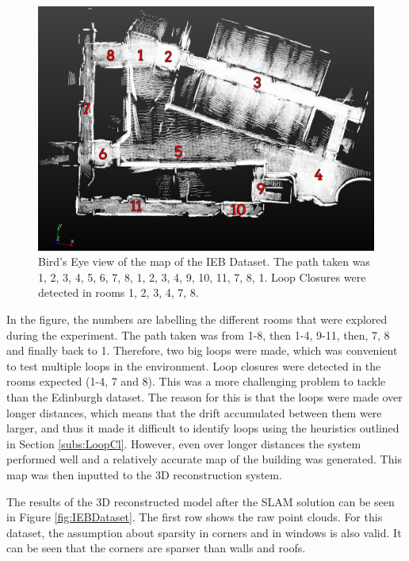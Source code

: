 \documentclass[11pt]{article}
\begin{document}
\begin{figure}[h]
	\centering
	\includegraphics[width=0.8\linewidth]{Maps2/TopViewMarked}
	\caption{Bird's Eye view of the map of the IEB Dataset. The path taken was 1, 2, 3, 4, 5, 6, 7, 8, 1, 2, 3, 4, 9, 10, 11, 7, 8, 1. Loop Closures were detected in rooms 1, 2, 3, 4, 7, 8.}
	\label{fig:TopViewIEBDataset}
\end{figure}
	
In the figure, the numbers are labelling the different rooms that were explored during the experiment. The path taken was from 1-8, then 1-4, 9-11, then, 7, 8 and finally back to 1. Therefore, two big loops were made, which was convenient to test multiple loops in the environment. Loop closures were detected in the rooms expected (1-4, 7 and 8). This was a more challenging problem to tackle than the Edinburgh dataset. The reason for this is that the loops were made over longer distances, which means that the drift accumulated between them were larger, and thus it made it difficult to identify loops using the heuristics outlined in Section \ref{subs:LoopCl}. However, even over longer distances the system performed well and a relatively accurate map of the building was generated. This map was then inputted to the 3D reconstruction system. 

The results of the 3D reconstructed model after the SLAM solution can be seen in Figure \ref{fig:IEBDataset}. The first row shows the raw point clouds. For this dataset, the assumption about sparsity in corners and in windows is also valid. It can be seen that the corners are sparser than walls and roofs.
	
\end{document}
